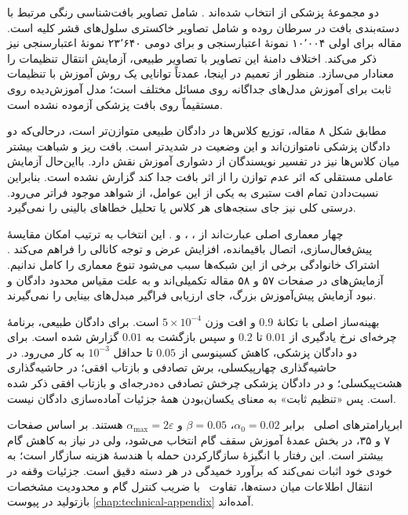 دو مجموعهٔ پزشکی از  انتخاب شده‌اند \cite{yang2023medmnist}.  شامل تصاویر بافت‌شناسی رنگی مرتبط با دسته‌بندی بافت در سرطان روده و  شامل تصاویر خاکستری سلول‌های قشر کلیه است. مقاله برای اولی ۱۰٬۰۰۴ نمونهٔ اعتبارسنجی و برای دومی ۲۳٬۶۴۰ نمونهٔ اعتبارسنجی نیز ذکر می‌کند. اختلاف دامنهٔ این تصاویر با تصاویر طبیعی، آزمایش انتقال تنظیمات را معنادار می‌سازد. منظور از تعمیم در اینجا، عمدتاً توانایی یک روش آموزش با تنظیمات ثابت برای آموزش مدل‌های جداگانه روی مسائل مختلف است؛ مدل آموزش‌دیده روی  مستقیماً روی بافت پزشکی آزموده نشده است.

مطابق شکل ۸ مقاله، توزیع کلاس‌ها در دادگان طبیعی متوازن‌تر است، درحالی‌که دو دادگان پزشکی نامتوازن‌اند و این وضعیت در  شدیدتر است. بافت ریز و شباهت بیشتر میان کلاس‌ها نیز در تفسیر نویسندگان از دشواری آموزش نقش دارد. بااین‌حال آزمایش عاملی مستقلی که اثر عدم توازن را از اثر بافت جدا کند گزارش نشده است. بنابراین نسبت‌دادن تمام افت ستبری به یکی از این عوامل، از شواهد موجود فراتر می‌رود. درستی کلی نیز جای سنجه‌های هر کلاس یا تحلیل خطاهای بالینی را نمی‌گیرد.

چهار معماری اصلی عبارت‌اند از ، ،  و . این انتخاب به ترتیب امکان مقایسهٔ پیش‌فعال‌سازی، اتصال باقیمانده، افزایش عرض و توجه کانالی را فراهم می‌کند \cite{he2016identity,he2016deep,zagoruyko2016wide,hu2018squeeze}. اشتراک خانوادگی برخی از این شبکه‌ها سبب می‌شود تنوع معماری را کامل ندانیم. آزمایش‌های  در صفحات ۵۷ و ۵۸ مقاله تکمیلی‌اند و به علت مقیاس محدود دادگان و نبود آزمایش پیش‌آموزش بزرگ، جای ارزیابی فراگیر مبدل‌های بینایی را نمی‌گیرند.

بهینه‌ساز اصلی  با تکانهٔ $0.9$ و افت وزن $5\times10^{-4}$ است. برای دادگان طبیعی، برنامهٔ چرخه‌ای نرخ یادگیری از $0.01$ تا $0.2$ و سپس بازگشت به $0.01$ گزارش شده است. برای دو دادگان پزشکی، کاهش کسینوسی از $0.05$ تا حداقل $10^{-3}$ به کار می‌رود. در  حاشیه‌گذاری چهارپیکسلی، برش تصادفی و بازتاب افقی؛ در  حاشیه‌گذاری هشت‌پیکسلی؛ و در دادگان پزشکی چرخش تصادفی ده‌درجه‌ای و بازتاب افقی ذکر شده است. پس «تنظیم ثابت» به معنای یکسان‌بودن همهٔ جزئیات آماده‌سازی دادگان نیست.

ابرپارامترهای اصلی \sora\ برابر $\alpha_0=0.02$، $\beta=0.05$ و $\alpha_{\max}=2\varepsilon$ هستند. بر اساس صفحات ۷ و ۳۵، در بخش عمدهٔ آموزش  سقف گام انتخاب می‌شود، ولی در  نیاز به کاهش گام بیشتر است. این رفتار با انگیزهٔ سازگارکردن حمله با هندسهٔ هزینه سازگار است؛ به خودی خود اثبات نمی‌کند که برآورد خمیدگی در هر دسته دقیق است. جزئیات وقفه در انتقال اطلاعات میان دسته‌ها، تفاوت \pertalign\ با ضریب کنترل گام و محدودیت مشخصات بازتولید در پیوست \ref{chap:technical-appendix} آمده‌اند.

